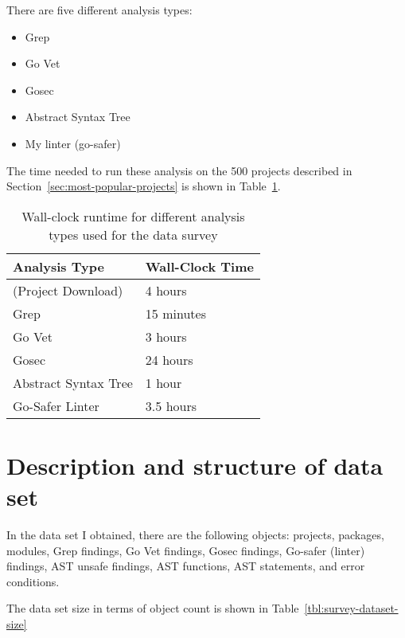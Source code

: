 There are five different analysis types:

\begin{itemize}
    \item Grep
    \item Go Vet
    \item Gosec
    \item Abstract Syntax Tree
    \item My linter (go-safer)
\end{itemize}

The time needed to run these analysis on the 500 projects described in Section~\ref{sec:most-popular-projects} is shown
in Table~\ref{tbl:survey-analysis-wallclocktime}.

\begin{table}[h]
    \centering
    \caption{Wall-clock runtime for different analysis types used for the data survey}
    \label{tbl:survey-analysis-wallclocktime}
    \begin{tabular}{ll}
        \toprule
        Analysis Type & Wall-Clock Time \\
        \midrule
        (Project Download) & 4 hours \\
        Grep & 15 minutes \\
        Go Vet & 3 hours \\
        Gosec & 24 hours \\
        Abstract Syntax Tree & 1 hour \\
        Go-Safer Linter & 3.5 hours \\
        \bottomrule
    \end{tabular}
\end{table}



\section{Description and structure of data set}\label{sec:survey-dataset}

In the data set I obtained, there are the following objects: projects, packages, modules,  Grep findings, Go Vet findings,
Gosec findings, Go-safer (linter) findings, AST unsafe findings, AST functions, AST statements, and error conditions.

The data set size in terms of object count is shown in Table~\ref{tbl:survey-dataset-size}

